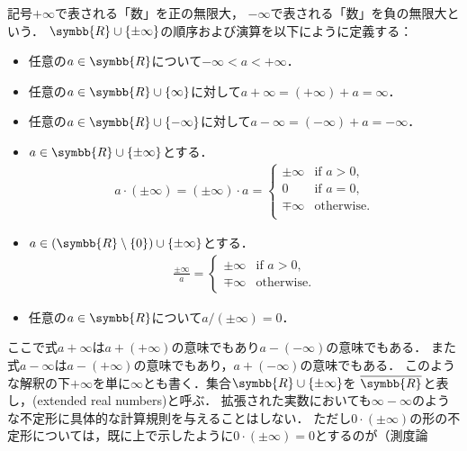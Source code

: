 \documentclass{ltjsbook}
\begin{document}
\begin{definition} 記号\(+\infty\)で表される「数」を正の無限大，
\(- \infty\)で表される「数」を負の無限大という．
\(\symbb{R} \cup \{\pm \infty\}\)の順序および演算を以下にように定義する：
\begin{itemize}
    \item 任意の\(a \in \symbb{R}\)について\(- \infty < a < + \infty\)．
    \item 任意の\(a \in \symbb{R} \cup \{\infty\}\)に対して\(a + \infty = (+ \infty) + a = \infty\)．
    \item 任意の\(a \in \symbb{R} \cup \{-\infty\}\)に対して\(a - \infty = (- \infty) + a = -\infty\)．
    \item \(a \in \symbb{R} \cup \{\pm \infty\}\)とする．
        \begin{align*}
            a \cdot (\pm \infty) = (\pm \infty) \cdot a =
            \begin{cases}
                \pm \infty & \text{if \(a > 0\),}\\
                0          & \text{if \(a = 0\),}\\
                \mp \infty & \text{otherwise.} \\
            \end{cases}
        \end{align*}
    \item \(a \in (\symbb{R} \setminus \{0\}) \cup \{\pm \infty\}\)とする．
        \begin{align*}
            \frac{\pm \infty}{a} =
            \begin{cases}
                \pm \infty & \text{if \(a > 0\),}\\
                \mp \infty & \text{otherwise.}
            \end{cases}
        \end{align*}
    \item 任意の\(a \in \symbb{R}\)について\(a/(\pm \infty) = 0\)．
\end{itemize}
ここで式\(a + \infty\)は\(a + (+\infty)\)の意味でもあり\(a - (- \infty)\)の意味でもある．
また式\(a - \infty\)は\(a - (+ \infty)\)の意味でもあり，\(a + (- \infty)\)の意味でもある．
このような解釈の下\(+ \infty\)を単に\(\infty\)とも書く．集合\(\symbb{R} \cup \{\pm \infty\}\)を
\(\overline{\symbb{R}}\)と表し，(extended real numbers)と呼ぶ．
拡張された実数においても\(\infty - \infty\)のような不定形に具体的な計算規則を与えることはしない．
ただし\(0 \cdot (\pm \infty)\)の形の不定形については，既に上で示したように\(0 \cdot (\pm \infty) = 0\)とするのが（測度論
\end{definition}
\end{document}

